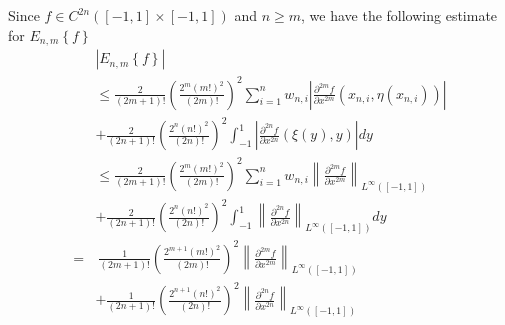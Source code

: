 \documentclass[a4paper]{article}
\numberwithin{equation}{section}
\begin{document}
Since $f \in {C^{2n}}\left( {\left[ { - 1,1} \right] \times \left[ { - 1,1} \right]} \right)$ and $n\ge m$, we have the following estimate for ${E_{n,m}}\left\{ f \right\}$
\begin{align}
&\left| {{E_{n,m}}\left\{ f \right\}} \right|\\
& \le \frac{2}{{\left( {2m + 1} \right)!}}{\left( {\frac{{{2^m}{{\left( {m!} \right)}^2}}}{{\left( {2m} \right)!}}} \right)^2}\sum\limits_{i = 1}^n {{w_{n,i}}\left| {{{\frac{{{\partial ^{2m}}f}}{{\partial {x^{2m}}}}}}\left( {{x_{n,i}},\eta \left( {{x_{n,i}}} \right)} \right)} \right|} \\
& + \frac{2}{{\left( {2n + 1} \right)!}}{\left( {\frac{{{2^n}{{\left( {n!} \right)}^2}}}{{\left( {2n} \right)!}}} \right)^2}\int_{ - 1}^1 {\left| {{{\frac{{{\partial ^{2n}}f}}{{\partial {x^{2n}}}}}}\left( {\xi \left( y \right),y} \right)} \right|dy} \\
& \le \frac{2}{{\left( {2m + 1} \right)!}}{\left( {\frac{{{2^m}{{\left( {m!} \right)}^2}}}{{\left( {2m} \right)!}}} \right)^2}\sum\limits_{i = 1}^n {{w_{n,i}}} {\left\| {{{\frac{{{\partial ^{2m}}f}}{{\partial {x^{2m}}}}}}} \right\|_{{L^\infty }\left( {\left[ { - 1,1} \right]} \right)}}\\
& + \frac{2}{{\left( {2n + 1} \right)!}}{\left( {\frac{{{2^n}{{\left( {n!} \right)}^2}}}{{\left( {2n} \right)!}}} \right)^2}\int_{ - 1}^1 {{{\left\| {{{\frac{{{\partial ^{2n}}f}}{{\partial {x^{2n}}}}}}} \right\|}_{{L^\infty }\left( {\left[ { - 1,1} \right]} \right)}}dy} \\
=&\ \frac{1}{{\left( {2m + 1} \right)!}}{\left( {\frac{{{2^{m + 1}}{{\left( {m!} \right)}^2}}}{{\left( {2m} \right)!}}} \right)^2}{\left\| {{{\frac{{{\partial ^{2m}}f}}{{\partial {x^{2m}}}}}}} \right\|_{{L^\infty }\left( {\left[ { - 1,1} \right]} \right)}}\\
& + \frac{1}{{\left( {2n + 1} \right)!}}{\left( {\frac{{{2^{n + 1}}{{\left( {n!} \right)}^2}}}{{\left( {2n} \right)!}}} \right)^2}{\left\| {{{\frac{{{\partial ^{2n}}f}}{{\partial {x^{2n}}}}}}} \right\|_{{L^\infty }\left( {\left[ { - 1,1} \right]} \right)}}
\end{align} 
\end{document}
